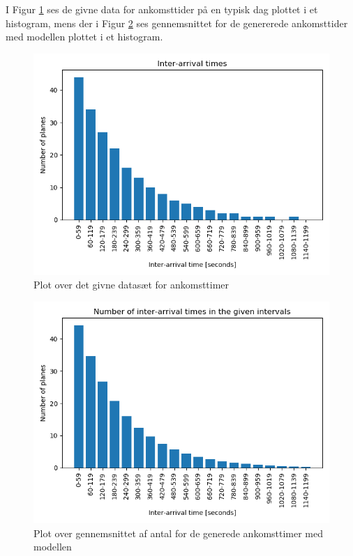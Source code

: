 I Figur \ref{fig:given_arrival_time_plot} ses de givne data for ankomsttider på en typisk dag plottet i et histogram, mens der i Figur \ref{fig:model_arrival_time_plot} ses gennemsnittet for de genererede ankomsttider med modellen plottet i et histogram.

\begin{figure}[h!]
	\centering
	\includegraphics[scale=0.7]{fig/img/given_arrival_time_plot.png}
	\caption{Plot over det givne datasæt for ankomsttimer} \label{fig:given_arrival_time_plot}
\end{figure}

\begin{figure}[h!]
	\centering
	\includegraphics[scale=0.7]{fig/img/model_arrival_time_plot.png}
	\caption{Plot over gennemsnittet af antal for de generede ankomsttimer med modellen} \label{fig:model_arrival_time_plot}
\end{figure}

